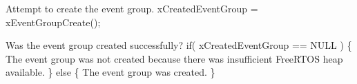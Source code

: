 \begin{DoxyPre}Attempt to create the event group.
    xCreatedEventGroup = xEventGroupCreate();\end{DoxyPre}



\begin{DoxyPre}Was the event group created successfully?
    if( xCreatedEventGroup == NULL )
    \{
The event group was not created because there was insufficient
FreeRTOS heap available.
    \}
    else
    \{
The event group was created.
    \}
   \end{DoxyPre}
 